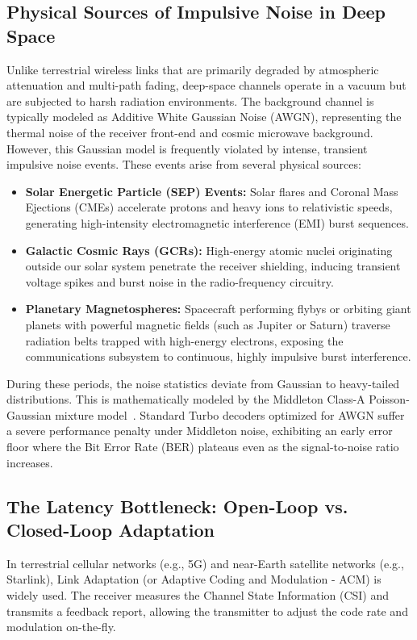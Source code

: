 \documentclass[journal,twocolumn]{IEEEtran}
\begin{document}
\subsection{Physical Sources of Impulsive Noise in Deep Space}
Unlike terrestrial wireless links that are primarily degraded by atmospheric attenuation and multi-path fading, deep-space channels operate in a vacuum but are subjected to harsh radiation environments. The background channel is typically modeled as Additive White Gaussian Noise (AWGN), representing the thermal noise of the receiver front-end and cosmic microwave background. However, this Gaussian model is frequently violated by intense, transient impulsive noise events. These events arise from several physical sources:
\begin{itemize}
  \item \textbf{Solar Energetic Particle (SEP) Events:} Solar flares and Coronal Mass Ejections (CMEs) accelerate protons and heavy ions to relativistic speeds, generating high-intensity electromagnetic interference (EMI) burst sequences.
  \item \textbf{Galactic Cosmic Rays (GCRs):} High-energy atomic nuclei originating outside our solar system penetrate the receiver shielding, inducing transient voltage spikes and burst noise in the radio-frequency circuitry.
  \item \textbf{Planetary Magnetospheres:} Spacecraft performing flybys or orbiting giant planets with powerful magnetic fields (such as Jupiter or Saturn) traverse radiation belts trapped with high-energy electrons, exposing the communications subsystem to continuous, highly impulsive burst interference.
\end{itemize}
During these periods, the noise statistics deviate from Gaussian to heavy-tailed distributions. This is mathematically modeled by the Middleton Class-A Poisson-Gaussian mixture model~\cite{middleton1977radiation}. Standard Turbo decoders optimized for AWGN suffer a severe performance penalty under Middleton noise, exhibiting an early error floor where the Bit Error Rate (BER) plateaus even as the signal-to-noise ratio increases.

\subsection{The Latency Bottleneck: Open-Loop vs. Closed-Loop Adaptation}
In terrestrial cellular networks (e.g., 5G) and near-Earth satellite networks (e.g., Starlink), Link Adaptation (or Adaptive Coding and Modulation - ACM) is widely used. The receiver measures the Channel State Information (CSI) and transmits a feedback report, allowing the transmitter to adjust the code rate and modulation on-the-fly. 
\end{document}
